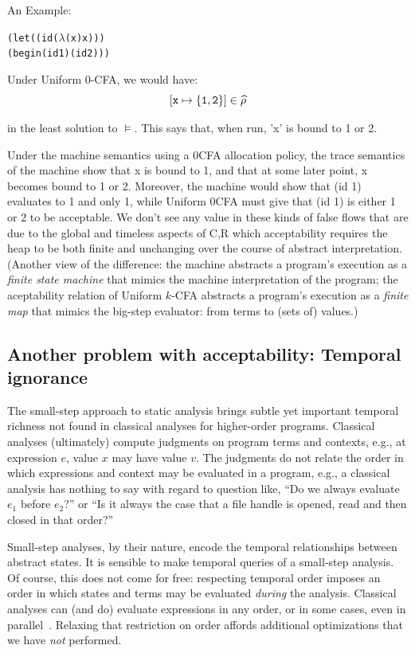 \documentclass[preprint,onecolumn,9pt]{sigplanconf} %
\begin{document}
An Example:

\begin{alltt}
 (let ((id (\(\lambda\) (x) x)))
   (begin (id 1) (id 2)))
\end{alltt}

Under Uniform 0-CFA, we would have:
\[
   [{\tt x} \mapsto \{{\tt 1}, {\tt 2}\}] \in \widehat\rho
\]

in the least solution to $\models$.  This says that, when run, 'x' is
bound to 1 or 2.

Under the machine semantics using a 0CFA allocation policy, the trace
semantics of the machine show that x is bound to 1, and that at some
later point, x becomes bound to 1 or 2.  Moreover, the machine would
show that (id 1) evaluates to 1 and only 1, while Uniform 0CFA must
give that (id 1) is either 1 or 2 to be acceptable.  We don't see any
value in these kinds of false flows that are due to the global and
timeless aspects of C,R which acceptability requires the heap to be
both finite and unchanging over the course of abstract
interpretation. (Another view of the difference: the machine abstracts
a program's execution as a \emph{finite state machine} that mimics the
machine interpretation of the program; the aceptability relation of
Uniform \(k\)-CFA abstracts a program's execution as a \emph{finite
  map} that mimics the big-step evaluator: from terms to (sets of)
values.)


\subsection{Another problem with acceptability: Temporal ignorance}

The small-step approach to static analysis brings subtle yet important temporal
richness not found in classical analyses for higher-order programs.
%
Classical analyses (ultimately) compute judgments on program terms and
contexts, e.g., at expression $e$, value $x$ may have value $v$.
%
The judgments do not relate the order in which expressions and context may be
evaluated in a program, e.g., a classical analysis has nothing to say with
regard to question like, ``Do we always evaluate $e_1$ before $e_2$?'' or ``Is
it always the case that a file handle is opened, read and then closed in that
order?''

Small-step analyses, by their nature, encode the temporal relationships between
abstract states.
%
It is sensible to make temporal queries of a small-step analysis.
%
Of course, this does not come for free: respecting temporal order imposes an
order in which states and terms may be evaluated \emph{during} the analysis.
%
Classical analyses can (and do) evaluate expressions in any order, or in some
cases, even in parallel~\cite{might:Prabhu:2010:EigenCFA}.
%
Relaxing that restriction on order affords additional optimizations that we
have \emph{not} performed.
\end{document}
